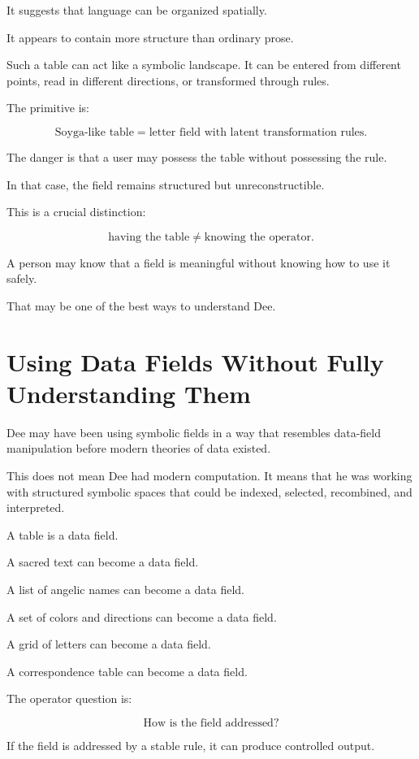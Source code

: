 \documentclass[11pt]{book}
\begin{document}
It suggests that language can be organized spatially.

It appears to contain more structure than ordinary prose.

Such a table can act like a symbolic landscape. It can be entered from different points, read in different directions, or transformed through rules.

The primitive is:

\[
\text{Soyga-like table} = \text{letter field with latent transformation rules}.
\]

The danger is that a user may possess the table without possessing the rule.

In that case, the field remains structured but unreconstructible.

This is a crucial distinction:

\[
\text{having the table} \neq \text{knowing the operator}.
\]

A person may know that a field is meaningful without knowing how to use it safely.

That may be one of the best ways to understand Dee.

\section{Using Data Fields Without Fully Understanding Them}

Dee may have been using symbolic fields in a way that resembles data-field manipulation before modern theories of data existed.

This does not mean Dee had modern computation. It means that he was working with structured symbolic spaces that could be indexed, selected, recombined, and interpreted.

A table is a data field.

A sacred text can become a data field.

A list of angelic names can become a data field.

A set of colors and directions can become a data field.

A grid of letters can become a data field.

A correspondence table can become a data field.

The operator question is:

\[
\text{How is the field addressed?}
\]

If the field is addressed by a stable rule, it can produce controlled output.
\end{document}
